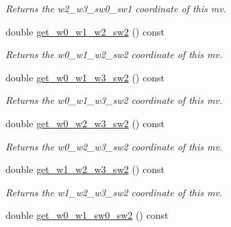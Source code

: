 \begin{DoxyCompactItemize}
\begin{DoxyCompactList}\small\item\em Returns the w2\-\_\-w3\-\_\-sw0\-\_\-sw1 coordinate of this mv. \end{DoxyCompactList}\item 
\hypertarget{classe3ga_1_1mv_aaaf68669deb8d3ae933ed767057c998a}{double \hyperlink{classe3ga_1_1mv_aaaf68669deb8d3ae933ed767057c998a}{get\-\_\-w0\-\_\-w1\-\_\-w2\-\_\-sw2} () const }\label{classe3ga_1_1mv_aaaf68669deb8d3ae933ed767057c998a}

\begin{DoxyCompactList}\small\item\em Returns the w0\-\_\-w1\-\_\-w2\-\_\-sw2 coordinate of this mv. \end{DoxyCompactList}\item 
\hypertarget{classe3ga_1_1mv_a9b6f029152e9ad3521a863d235390774}{double \hyperlink{classe3ga_1_1mv_a9b6f029152e9ad3521a863d235390774}{get\-\_\-w0\-\_\-w1\-\_\-w3\-\_\-sw2} () const }\label{classe3ga_1_1mv_a9b6f029152e9ad3521a863d235390774}

\begin{DoxyCompactList}\small\item\em Returns the w0\-\_\-w1\-\_\-w3\-\_\-sw2 coordinate of this mv. \end{DoxyCompactList}\item 
\hypertarget{classe3ga_1_1mv_a54ba5bfa8a5bcdf5678d6e14da66f648}{double \hyperlink{classe3ga_1_1mv_a54ba5bfa8a5bcdf5678d6e14da66f648}{get\-\_\-w0\-\_\-w2\-\_\-w3\-\_\-sw2} () const }\label{classe3ga_1_1mv_a54ba5bfa8a5bcdf5678d6e14da66f648}

\begin{DoxyCompactList}\small\item\em Returns the w0\-\_\-w2\-\_\-w3\-\_\-sw2 coordinate of this mv. \end{DoxyCompactList}\item 
\hypertarget{classe3ga_1_1mv_ab1aa9b7a0a67d0860cc149603e80c3d0}{double \hyperlink{classe3ga_1_1mv_ab1aa9b7a0a67d0860cc149603e80c3d0}{get\-\_\-w1\-\_\-w2\-\_\-w3\-\_\-sw2} () const }\label{classe3ga_1_1mv_ab1aa9b7a0a67d0860cc149603e80c3d0}

\begin{DoxyCompactList}\small\item\em Returns the w1\-\_\-w2\-\_\-w3\-\_\-sw2 coordinate of this mv. \end{DoxyCompactList}\item 
\hypertarget{classe3ga_1_1mv_a597816c6d5598de75f675d6007a0bba3}{double \hyperlink{classe3ga_1_1mv_a597816c6d5598de75f675d6007a0bba3}{get\-\_\-w0\-\_\-w1\-\_\-sw0\-\_\-sw2} () const }\label{classe3ga_1_1mv_a597816c6d5598de75f675d6007a0bba3}


\end{DoxyCompactItemize}
